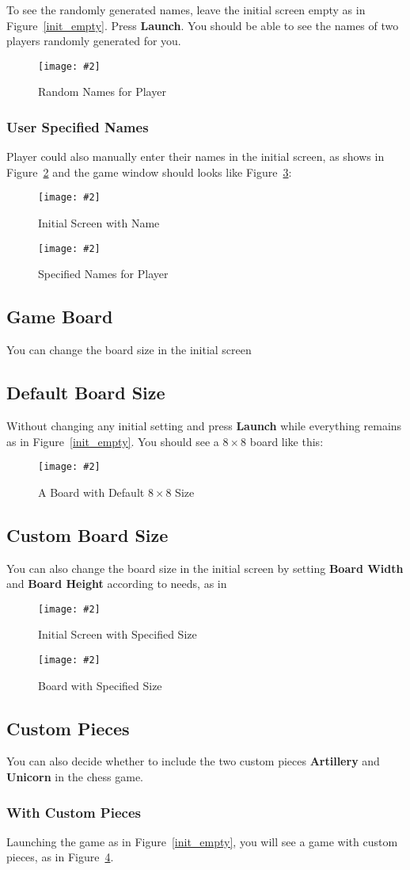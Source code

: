 \documentclass[12pt]{article}
\newcommand{\img}[3]{
\begin{figure}[!ht]
\begin{center}
\texttt{[image: \#2]}
\caption{#3}\label{#2}
\end{center}
\end{figure}
}
\newcommand{\B}[1]{\textbf{#1}}
\begin{document}
To see the randomly generated names, leave the initial screen empty as in Figure~\ref{init_empty}. Press \B{Launch}. You should be able to see the names of two players randomly generated for you.
\img{0.45}{random_name}{Random Names for Player}

\subsubsection{User Specified Names}
Player could also manually enter their names in the initial screen, as shows in Figure~\ref{init_names} and the game window should looks like Figure~\ref{specified_name}:
\img{0.7}{init_names}{Initial Screen with Name}
\img{0.45}{specified_name}{Specified Names for Player}

\subsection{Game Board}
You can change the board size in the initial screen

\subsection{Default Board Size}
Without changing any initial setting and press \B{Launch} while everything remains as in Figure~\ref{init_empty}. You should see a $8\times8$ board like this:
\img{0.45}{board_default_size}{A Board with Default $8\times8$ Size}

\subsection{Custom Board Size}
You can also change the board size in the initial screen by setting \B{Board Width} and \B{Board Height} according to needs, as in
\img{0.7}{init_board_size}{Initial Screen with Specified Size}
\img{0.45}{board_specified_size}{Board with Specified Size}

\subsection{Custom Pieces}
You can also decide whether to include the two custom pieces \B{Artillery} and \B{Unicorn} in the chess game.

\subsubsection{With Custom Pieces}
Launching the game as in Figure~\ref{init_empty}, you will see a game with custom pieces, as in Figure~\ref{board_default_size}.
\end{document}
